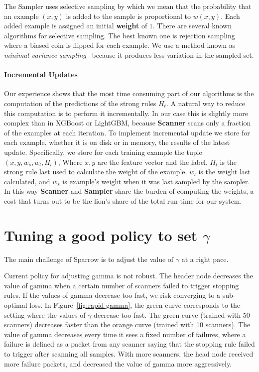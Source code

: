 The Sampler uses selective sampling by which we mean that the
probability that an example $(x,y)$ is added to the sample is
proportional to $w(x,y)$. Each added example is assigned an initial
{\bf weight} of $1$.
{There are several known algorithms
  for selective sampling. The best known one is rejection sampling
  where a biased coin is flipped for each example. We use a method
  known as \textit{minimal variance sampling}~\cite{kitagawa_monte_1996}
  because it produces less variation in the sampled set.}
  
\paragraph*{Incremental Updates} Our experience shows that the most
time consuming part of our algorithms is the computation of the
predictions of the strong rules $H_t$. A natural way to reduce this
computation is to perform it incrementally. In our case this is
slightly more complex than in XGBoost or LightGBM, because {\bf
  Scanner} scans only a  fraction of the examples at each
iteration. To implement incremental update we store for each example,
whether it is on disk or in memory, the results of the latest
update. Specifically, we store for each training example the tuple
$(x, y, w_s, w_l,H_l)$, Where $x,y$ are the feature vector and the
label, $H_l$ is the strong rule last used to calculate the weight of
the example. $w_l$ is the weight last calculated, and $w_s$ is
example's weight when it was last sampled by the sampler. In this way
{\bf Scanner} and {\bf Sampler} share the burden of computing
the weights, a cost that turns out to be the lion's share of the total
run time for our system.




\section{Tuning a good policy to set $\gamma$}

The main challenge of Sparrow is to adjust the value of $\gamma$ at a right pace.

Current policy for adjusting gamma is not robust. The header node decreases
the value of gamma when a certain number of scanners failed to trigger stopping
rules.
If the values of gamma decrease too fast, we risk converging to a sub-optimal loss.
In Figure~\ref{fig:rapid-gamma}, the green curve corresponds to the setting
where the values of $\gamma$ decrease too fast.
The green curve (trained with 50 scanners) decreases faster than the orange curve (trained with 10 scanners).
The value of gamma decreases every time it sees a fixed number of failures, where a failure is defined as a packet from any scanner saying that the stopping rule failed to trigger after scanning all samples. With more scanners, the head node received more failure packets, and decreased the value of gamma more aggressively.

